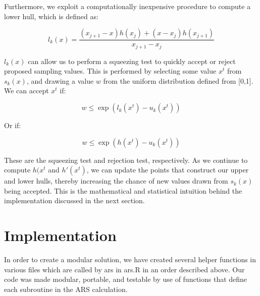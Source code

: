 \documentclass[12pt, oneside]{article}
\begin{document}
Furthermore, we exploit a computationally inexpensive procedure to compute a lower hull, which is defined as:

\[ l_k(x) = \frac{(x_{j+1} - x)h(x_j) + (x - x_j) h(x_{j+1})}{x_{j+1} - x_{j}} \]

\(l_k(x) \) can allow us to perform a squeezing test to quickly accept or reject proposed sampling values.  This is performed by selecting some value \(x^t\) from \(s_k(x)\), and drawing a value \(w\) from the uniform distribution defined from [0,1].  We can accept \(x^t\) if:

\[ w \le \exp(l_k(x^t) - u_k(x^t)) \]

Or if:

\[ w \le \exp(h(x^t) - u_k(x^t)) \]

These are the squeezing test and rejection test, respectively.  As we continue to compute \(h(x^t\) and \(h'(x^t)\), we can update the points that construct our upper and lower hulls, thereby increasing the chance of new values drawn from \(s_k(x)\) being accepted.  This is the mathematical and statistical intuition behind the implementation discussed in the next section.

\section{Implementation}

In order to create a modular solution, we have created several helper functions in various files which are called by ars in ars.R in an order described above.  Our code was made modular, portable, and testable by use of functions that define each subroutine in the ARS calculation.
\end{document}
